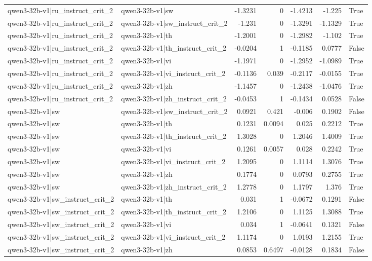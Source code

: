 \begin{table}
\begin{tabular}{l l r r r r l}
qwen3-32b-v1|ru_instruct_crit_2 & qwen3-32b-v1|sw & -1.3231 & 0 & -1.4213 & -1.225 & True \\
qwen3-32b-v1|ru_instruct_crit_2 & qwen3-32b-v1|sw_instruct_crit_2 & -1.231 & 0 & -1.3291 & -1.1329 & True \\
qwen3-32b-v1|ru_instruct_crit_2 & qwen3-32b-v1|th & -1.2001 & 0 & -1.2982 & -1.102 & True \\
qwen3-32b-v1|ru_instruct_crit_2 & qwen3-32b-v1|th_instruct_crit_2 & -0.0204 & 1 & -0.1185 & 0.0777 & False \\
qwen3-32b-v1|ru_instruct_crit_2 & qwen3-32b-v1|vi & -1.1971 & 0 & -1.2952 & -1.0989 & True \\
qwen3-32b-v1|ru_instruct_crit_2 & qwen3-32b-v1|vi_instruct_crit_2 & -0.1136 & 0.039 & -0.2117 & -0.0155 & True \\
qwen3-32b-v1|ru_instruct_crit_2 & qwen3-32b-v1|zh & -1.1457 & 0 & -1.2438 & -1.0476 & True \\
qwen3-32b-v1|ru_instruct_crit_2 & qwen3-32b-v1|zh_instruct_crit_2 & -0.0453 & 1 & -0.1434 & 0.0528 & False \\
qwen3-32b-v1|sw & qwen3-32b-v1|sw_instruct_crit_2 & 0.0921 & 0.421 & -0.006 & 0.1902 & False \\
qwen3-32b-v1|sw & qwen3-32b-v1|th & 0.1231 & 0.0094 & 0.025 & 0.2212 & True \\
qwen3-32b-v1|sw & qwen3-32b-v1|th_instruct_crit_2 & 1.3028 & 0 & 1.2046 & 1.4009 & True \\
qwen3-32b-v1|sw & qwen3-32b-v1|vi & 0.1261 & 0.0057 & 0.028 & 0.2242 & True \\
qwen3-32b-v1|sw & qwen3-32b-v1|vi_instruct_crit_2 & 1.2095 & 0 & 1.1114 & 1.3076 & True \\
qwen3-32b-v1|sw & qwen3-32b-v1|zh & 0.1774 & 0 & 0.0793 & 0.2755 & True \\
qwen3-32b-v1|sw & qwen3-32b-v1|zh_instruct_crit_2 & 1.2778 & 0 & 1.1797 & 1.376 & True \\
qwen3-32b-v1|sw_instruct_crit_2 & qwen3-32b-v1|th & 0.031 & 1 & -0.0672 & 0.1291 & False \\
qwen3-32b-v1|sw_instruct_crit_2 & qwen3-32b-v1|th_instruct_crit_2 & 1.2106 & 0 & 1.1125 & 1.3088 & True \\
qwen3-32b-v1|sw_instruct_crit_2 & qwen3-32b-v1|vi & 0.034 & 1 & -0.0641 & 0.1321 & False \\
qwen3-32b-v1|sw_instruct_crit_2 & qwen3-32b-v1|vi_instruct_crit_2 & 1.1174 & 0 & 1.0193 & 1.2155 & True \\
qwen3-32b-v1|sw_instruct_crit_2 & qwen3-32b-v1|zh & 0.0853 & 0.6497 & -0.0128 & 0.1834 & False \\

\end{tabular}
\end{table}
